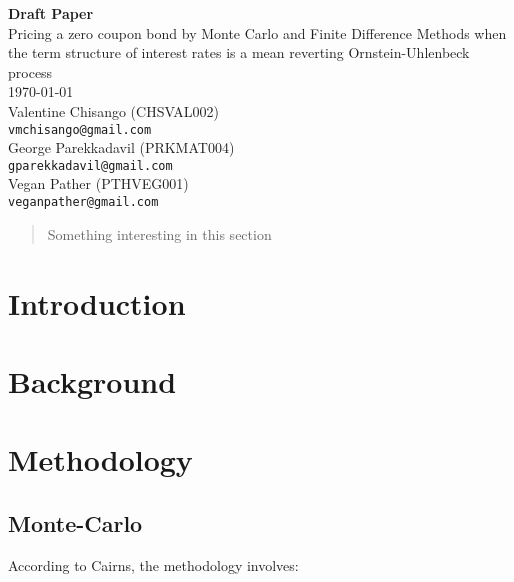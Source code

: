 \documentclass[12pt,a4paper]{article}
\begin{document}
	
	\begin{titlepage}
		
		\begin{center}
			\textbf{{\Large Draft Paper}}\\
			\vspace{1cm}
			{\Large Pricing a zero coupon bond by Monte Carlo and Finite Difference Methods when the term structure of interest rates is a mean reverting Ornstein-Uhlenbeck process}\\
			\vspace{1cm}
			\today\\
			Valentine Chisango (CHSVAL002)\\
			{\tt vmchisango@gmail.com}\\ 
			
			George Parekkadavil (PRKMAT004)\\
			{\tt gparekkadavil@gmail.com}\\
			
			Vegan Pather (PTHVEG001)\\
			\tt {veganpather@gmail.com}
			
		\end{center}
	
	\begin{abstract}
		Something interesting in this section
	\end{abstract}	

	\end{titlepage}
	\newpage
	
	\section{Introduction}
	\label{sec: Intro}
	
	\newpage
	\section{Background}
	\label{sec: Backgrd}
	
	\newpage
	\section{Methodology}
	\label{sec: Method}
	
	\subsection{Monte-Carlo}

According to Cairns, the methodology involves:
\end{document}
